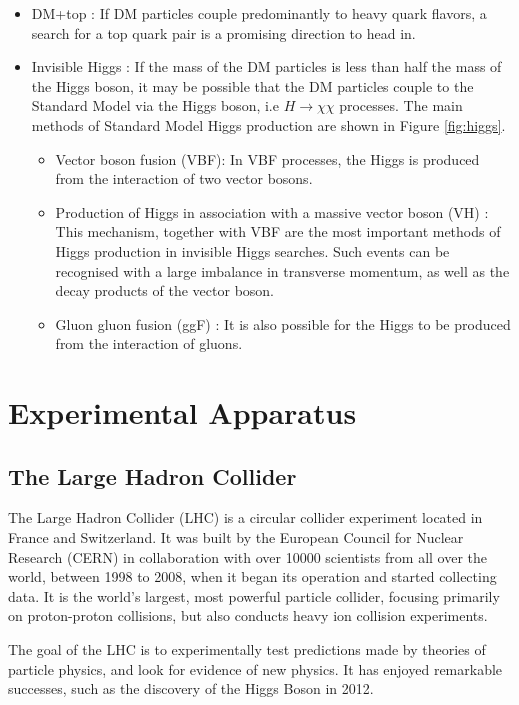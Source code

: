 \documentclass[11pt,a4paper,openright,twoside]{report}
\begin{document}
\begin{itemize}
\item DM+top : If DM particles couple predominantly to heavy quark flavors, a search for a top quark pair is a promising direction to head in.
\item Invisible Higgs :  If the mass of the DM particles is less than half the mass of the Higgs boson, it may be possible that the DM particles couple to the Standard Model via the Higgs boson, i.e $H\to\chi\chi$ processes. The main methods of Standard Model Higgs production are shown in Figure \ref{fig:higgs}.
	\begin{itemize}
	\item Vector boson fusion (VBF): In VBF processes, the Higgs is produced from the interaction of two vector bosons.
	\item Production of Higgs in association with a massive vector boson (VH) : This mechanism, together with VBF are the most important methods of Higgs production in invisible Higgs searches. Such events can be recognised with a large imbalance in transverse momentum, as well as the decay products of the vector boson.
	\item Gluon gluon fusion (ggF) : It is also possible for the Higgs to be produced from the interaction of gluons.
	\end{itemize}
\end{itemize}

\chapter{Experimental Apparatus}\label{ch:LHC}

\section{The Large Hadron Collider}
The Large Hadron Collider (LHC) is a circular collider experiment located in France and Switzerland. It was built by the European Council for Nuclear Research (CERN) in collaboration with over 10000 scientists from all over the world, between 1998 to 2008, when it began its operation and started collecting data. It is the world's largest, most powerful particle collider, focusing primarily on proton-proton collisions, but also conducts heavy ion collision experiments.

The goal of the LHC is to experimentally test predictions made by theories of particle physics, and look for evidence of new physics. It has enjoyed remarkable successes, such as the discovery of the Higgs Boson in 2012.
\end{document}

